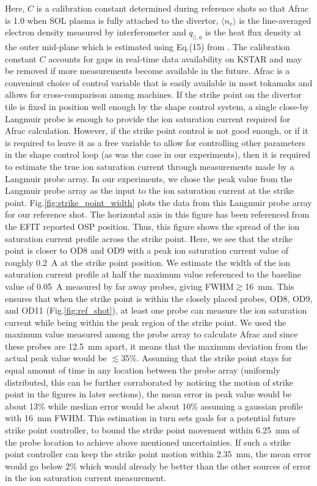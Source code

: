 Here, $C$ is a calibration constant determined during reference shots so that \ac{Afrac} is 1.0 when \ac{SOL} plasma is fully attached to the divertor, $\langle n_{e} \rangle$ is the line-averaged electron density measured by interferometer and $q_{||, a}$ is the heat flux density at the outer mid-plane which is estimated using Eq.(15) from \cite{Eldon_2022_PPCF}.
The calibration constant $C$ accounts for gaps in real-time data availability on KSTAR and may be removed if more measurements become available in the future.
\ac{Afrac} is a convenient choice of control variable that is easily available in most tokamaks and allows for cross-comparison among machines.
If the strike point on the divertor tile is fixed in position well enough by the shape control system, a single close-by Langmuir probe is enough to provide the ion saturation current required for \ac{Afrac} calculation.
However, if the strike point control is not good enough, or if it is required to leave it as a free variable to allow for controlling other parameters in the shape control loop (as was the case in our experiments), then it is required to estimate the true ion saturation current through measurements made by a Langmuir probe array.
In our experiments, we chose the peak value from the Langmuir probe array as the input to the ion saturation current at the strike point.
Fig.\ref{fig:strike_point_width} plots the data from this Langmuir probe array for our reference shot.
The horizontal axis in this figure has been referenced from the EFIT reported \ac{OSP} position.
Thus, this figure shows the spread of the ion saturation current profile across the strike point.
Here, we see that the strike point is closer to OD8 and OD9 with a peak ion saturation current value of roughly 0.2~A at the strike point position.
We estimate the width of the ion saturation current profile at half the maximum value referenced to the baseline value of 0.05~A measured by far away probes, giving FWHM$\gtrsim$16~mm.
This ensures that when the strike point is within the closely placed probes, OD8, OD9, and OD11 (Fig.\ref{fig:ref_shot}), at least one probe can measure the ion saturation current while being within the peak region of the strike point.
We used the maximum value measured among the probe array to calculate \ac{Afrac} and since these probes are 12.5~mm apart, it means that the maximum deviation from the actual peak value would be $\lesssim$35\%.
Assuming that the strike point stays for equal amount of time in any location between the probe array (uniformly distributed, this can be further corraborated by noticing the motion of strike point in the figures in later sections), the mean error in peak value would be about 13\% while median error would be about 10\% assuming a gaussian profile with 16~mm FWHM.
This estimation in turn sets goals for a potential future strike point controller, to bound the strike point movement within 6.25~mm of the probe location to achieve above mentioned uncertainties.
If such a strike point controller can keep the strike point motion within 2.35~mm, the mean error would go below 2\% which would already be better than the other sources of error in the ion saturation current measurement.

